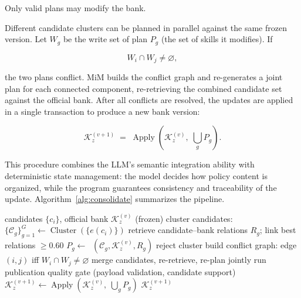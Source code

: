 \documentclass[11pt]{article}
\newcommand{\KK}{\mathcal{K}}
\newcommand{\CC}{\mathcal{C}}
\DeclareMathOperator{\Apply}{Apply}
\DeclareMathOperator{\Valid}{Valid}
\DeclareMathOperator{\Cluster}{Cluster}
\DeclareMathOperator{\Crud}{G_{crud}}
\begin{document}
\noindent Only valid plans may modify the bank.

Different candidate clusters can be planned in parallel against the same frozen
version. Let $W_g$ be the write set of plan $P_g$ (the set of skills it
modifies). If

\begin{equation}
\label{eq:conflict}
W_i \cap W_j \neq \varnothing,
\end{equation}

\noindent the two plans conflict. MiM builds the conflict graph and re-generates
a joint plan for each connected component, re-retrieving the combined candidate
set against the official bank. After all conflicts are resolved, the updates are
applied in a single transaction to produce a new bank version:

\begin{equation}
\label{eq:release}
\KK_z^{(v+1)} \;=\; \Apply\left(\KK_z^{(v)},\; \bigcup_g P_g\right).
\end{equation}

\noindent This procedure combines the LLM's semantic integration ability with
deterministic state management: the model decides how policy content is
organized, while the program guarantees consistency and traceability of the
update. Algorithm~\ref{alg:consolidate} summarizes the pipeline.

\begin{algorithm}[t]
\caption{Consolidation: candidate clusters $\rightarrow$ new bank version}
\label{alg:consolidate}
\begin{algorithmic}[1]
\Require candidates $\{c_i\}$, official bank $\KK_z^{(v)}$ (frozen)
\State cluster candidates: $\{\CC_g\}_{g=1}^{G} \leftarrow \Cluster(\{e(c_i)\})$
\For{each cluster $\CC_g$}
  \State retrieve candidate--bank relations $R_g$; link best relations $\ge 0.60$
  \State $P_g \leftarrow \Crud(\CC_g, \KK_z^{(v)}, R_g)$ 
  \If{$\Valid(P_g, \KK_z^{(v)}) = 0$} \State reject cluster \EndIf
\EndFor
\Repeat
  \State build conflict graph: edge $(i,j)$ iff $W_i \cap W_j \neq \varnothing$
    \State merge candidates, re-retrieve, re-plan jointly
  \EndFor
{}
\State run publication quality gate (payload validation, candidate support)
\State $\KK_z^{(v+1)} \leftarrow \Apply(\KK_z^{(v)},\; \bigcup_g P_g)$
\Return $\KK_z^{(v+1)}$
\end{algorithmic}
\end{algorithm}
\end{document}

